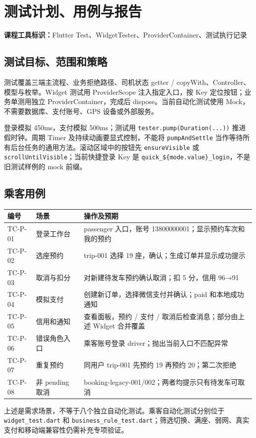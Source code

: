\documentclass[UTF8,fontset=fandol,zihao=-4,oneside]{ctexrep}
\newcommand{\pathcode}[1]{\nolinkurl{#1}}
\newcommand{\toolmark}[1]{\par\noindent\textbf{课程工具标识：}#1\par}
\begin{document}
\chapter{测试计划、用例与报告}
\toolmark{Flutter Test、WidgetTester、ProviderContainer、测试执行记录}
\section{测试目标、范围和策略}
测试覆盖三端主流程、业务拒绝路径、司机状态 getter / copyWith、Controller、模型与枚举。Widget 测试用 ProviderScope 注入指定入口，按 Key 定位按钮；业务单测用独立 ProviderContainer，完成后 dispose。当前自动化测试使用 Mock，不需要数据库、支付账号、GPS 设备或外部服务。

登录模拟 450ms，支付模拟 500ms；测试用 \texttt{tester.pump(Duration(...))} 推进假时钟。周期 Timer 及持续动画要显式控制，不能将 \texttt{pumpAndSettle} 当作等待所有后台任务的通用方法。滚动区域中的按钮先 \texttt{ensureVisible} 或 \texttt{scrollUntilVisible}；当前快捷登录 Key 是 \texttt{quick\_\$\{mode.value\}\_login}，不是旧测试样例的 mock 前缀。

\section{乘客用例}
\begin{longtable}{p{1.7cm}p{4.2cm}p{8.8cm}}
\toprule 编号 & 场景 & 操作及预期 \\ \midrule
TC-P-01 & 登录工作台 & passenger 入口，账号 13800000001；显示预约车次和我的预约 \\
TC-P-02 & 选座预约 & trip-001 选择 19 座，确认；生成订单并显示成功提示 \\
TC-P-03 & 取消与扣分 & 对新建待发车预约确认取消；扣 5 分，信用 96→91 \\
TC-P-04 & 模拟支付 & 创建新订单，选择微信支付并确认；paid 和本地成功通知 \\
TC-P-05 & 信用和通知 & 查看面板，预约 / 支付 / 取消后检查消息；部分由上述 Widget 合并覆盖 \\
TC-P-06 & 错误角色入口 & 乘客账号登录 driver；抛出当前入口不匹配异常 \\
TC-P-07 & 重复预约 & 同用户 trip-001 先预约 19 再预约 20；第二次拒绝 \\
TC-P-08 & 非 pending 取消 & booking-legacy-001/002；两者均提示只有待发车可取消 \\
\bottomrule
\end{longtable}
上述是需求场景，不等于八个独立自动化测试。乘客自动化测试分别位于 \pathcode{widget_test.dart} 和 \pathcode{business_rule_test.dart}；筛选切换、满座、弱网、真实支付和移动端兼容性仍需补充专项验证。
\end{document}
